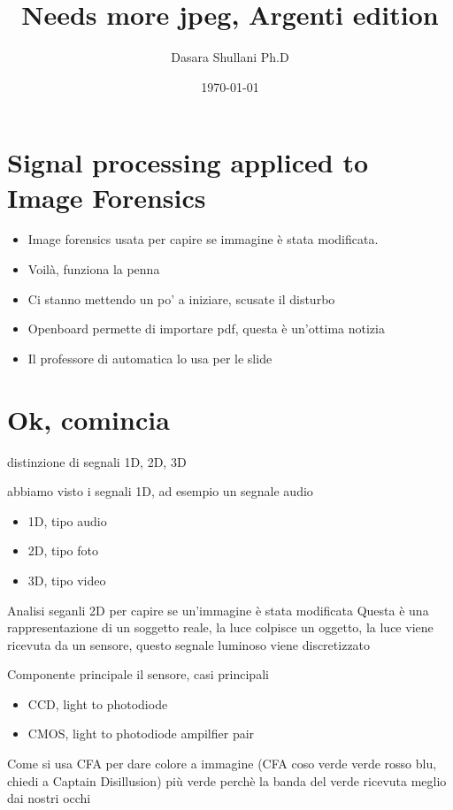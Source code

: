 \documentclass[11pt]{article}
\author{Dasara Shullani Ph.D}
\date{\today}
\title{Needs more jpeg, Argenti edition}
\begin{document}
\maketitle
\tableofcontents


\section{Signal processing appliced to Image Forensics}
\label{sec:orgc653bf9}
\begin{itemize}
\item Image forensics usata per capire se immagine è stata modificata.
\item Voilà, funziona la penna
\item Ci stanno mettendo un po' a iniziare, scusate il disturbo
\item Openboard permette di importare pdf, questa è un'ottima notizia
\item Il professore di automatica lo usa per le slide
\end{itemize}
\section{Ok, comincia}
\label{sec:org1e2feb7}
distinzione di segnali 1D, 2D, 3D

abbiamo visto i segnali 1D, ad esempio un segnale audio
\begin{itemize}
\item 1D, tipo audio
\item 2D, tipo foto
\item 3D, tipo video
\end{itemize}

Analisi seganli 2D per capire se un'immagine è stata modificata
Questa è una rappresentazione di un soggetto reale, la luce colpisce
un oggetto, la luce viene ricevuta da un sensore, questo segnale
luminoso viene discretizzato\par

Componente principale il sensore, casi principali
\begin{itemize}
\item CCD, light to photodiode
\item CMOS, light to photodiode ampilfier pair
\end{itemize}

Come si usa CFA per dare colore a immagine
(CFA coso verde verde rosso blu, chiedi a Captain Disillusion)
più verde perchè la banda del verde ricevuta meglio dai nostri occhi\par
\end{document}
